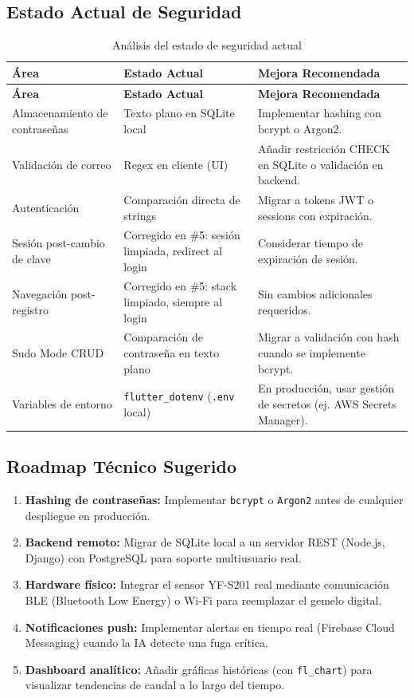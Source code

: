 \documentclass[12pt,a4paper]{article}
\begin{document}
\subsection{Estado Actual de Seguridad}

\begin{longtable}{p{4cm} p{4cm} p{5.5cm}}
\caption{Análisis del estado de seguridad actual} \label{tab:seguridad} \\
\toprule
\textbf{Área} & \textbf{Estado Actual} & \textbf{Mejora Recomendada} \\
\midrule
\endfirsthead
\toprule
\textbf{Área} & \textbf{Estado Actual} & \textbf{Mejora Recomendada} \\
\midrule
\endhead
\bottomrule
\endlastfoot
Almacenamiento de contraseñas &
  Texto plano en SQLite local &
  Implementar hashing con bcrypt o Argon2. \\[0.3em]
Validación de correo &
  Regex en cliente (UI) &
  Añadir restricción CHECK en SQLite o validación en backend. \\[0.3em]
Autenticación &
  Comparación directa de strings &
  Migrar a tokens JWT o sessions con expiración. \\[0.3em]
Sesión post-cambio de clave &
  \textcolor{normalgreen}{Corregido en \#5}: sesión limpiada, redirect al login &
  Considerar tiempo de expiración de sesión. \\[0.3em]
Navegación post-registro &
  \textcolor{normalgreen}{Corregido en \#5}: stack limpiado, siempre al login &
  Sin cambios adicionales requeridos. \\[0.3em]
Sudo Mode CRUD &
  Comparación de contraseña en texto plano &
  Migrar a validación con hash cuando se implemente bcrypt. \\[0.3em]
Variables de entorno &
  \texttt{flutter\_dotenv} (\texttt{.env} local) &
  En producción, usar gestión de secretos (ej. AWS Secrets Manager). \\
\end{longtable}

\subsection{Roadmap Técnico Sugerido}

\begin{enumerate}[leftmargin=2em]
  \item \textbf{Hashing de contraseñas:} Implementar \texttt{bcrypt} o \texttt{Argon2}
        antes de cualquier despliegue en producción.
  \item \textbf{Backend remoto:} Migrar de SQLite local a un servidor REST (Node.js, Django)
        con PostgreSQL para soporte multiusuario real.
  \item \textbf{Hardware físico:} Integrar el sensor YF-S201 real mediante comunicación
        BLE (Bluetooth Low Energy) o Wi-Fi para reemplazar el gemelo digital.
  \item \textbf{Notificaciones push:} Implementar alertas en tiempo real (Firebase Cloud
        Messaging) cuando la IA detecte una fuga crítica.
  \item \textbf{Dashboard analítico:} Añadir gráficas históricas (con \texttt{fl\_chart})
        para visualizar tendencias de caudal a lo largo del tiempo.
\end{enumerate}
\end{document}
